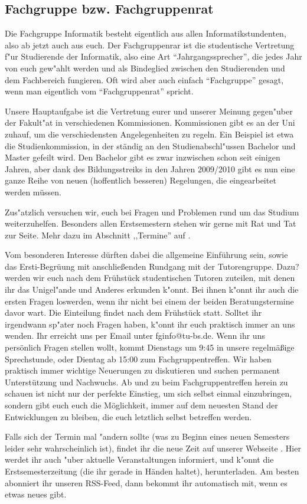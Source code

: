 \label{fachgruppe}\subsection{Fachgruppe bzw. Fachgruppenrat}

Die Fachgruppe Informatik besteht eigentlich aus allen 
Informatikstundenten, also ab jetzt auch aus euch. Der Fachgruppenrar 
ist die studentische Vertretung f"ur Studierende der Informatik, also 
eine Art "`Jahrgangssprecher"', die jedes Jahr von euch gew"ahlt werden 
und als Bindeglied zwischen den Studierenden und dem Fachbereich 
fungieren. Oft wird aber auch einfach "`Fachgruppe"' gesagt, wenn man 
eigentlich vom "`Fachgruppenrat"' spricht.

Unsere Hauptaufgabe ist die Vertretung eurer und unserer Meinung 
gegen"uber der Fakult"at in verschiedenen Kommissionen. Kommissionen 
gibt es an der Uni zuhauf, um die verschiedensten Angelegenheiten zu 
regeln. Ein Beispiel ist etwa die Studienkommission, in der ständig 
an den Studienabschl"ussen Bachelor und Master gefeilt wird. Den Bachelor 
gibt es zwar inzwischen schon seit einigen Jahren, aber dank des 
Bildungsstreiks in den Jahren 2009/2010 gibt es nun eine ganze Reihe 
von neuen (hoffentlich besseren) Regelungen, die eingearbeitet werden 
müssen.

Zus"atzlich versuchen wir, euch bei Fragen und Problemen rund um das 
Studium weiterzuhelfen. Besonders allen Erstsemestern stehen wir 
gerne mit Rat und Tat zur Seite.  Mehr dazu im Abschnitt ,,Termine'' auf
\pageref{termine}.

Vom besonderen Interesse dürften dabei die allgemeine Einführung sein,
sowie das Ersti-Begrüung mit anschließenden Rundgang mit der
Tutorengruppe.
Dazu? werden wir euch nach dem Frühstück studentischen 
Tutoren zuteilen, mit denen ihr das Unigel"ande und Anderes erkunden 
k"onnt. Bei ihnen k"onnt ihr auch die ersten Fragen loswerden, wenn 
ihr nicht bei einem der beiden Beratungstermine davor wart.
Die Einteilung findet nach dem Frühstück statt.
Solltet ihr irgendwann sp"ater noch Fragen haben, k"onnt ihr euch 
praktisch immer an uns wenden. Ihr erreicht uns per Email unter 
fginfo@tu-bs.de. Wenn ihr uns persönlich Fragen stellen wollt, kommt 
Dienstags um 9:45 in unsere regelmäßige Sprechstunde, oder Dientag ab 
15:00 zum Fachgruppentreffen. Wir haben praktisch immer wichtige 
Neuerungen zu diskutieren und suchen permanent Unterstützung und 
Nachwuchs. Ab und zu beim Fachgruppentreffen herein zu schauen ist 
nicht nur der perfekte Einstieg, um sich selbst einmal einzubringen, 
sondern gibt euch euch die Möglichkeit, immer auf dem neuesten Stand 
der Entwicklungen zu bleiben, die euch letztlich selbst betreffen werden.

Falls sich der Termin mal "andern sollte (was zu Beginn eines neuen 
Semesters leider sehr wahrscheinlich ist), findet ihr die neue Zeit 
auf unserer Webseite \mbox{}. Hier 
werdet ihr auch "uber aktuelle Veranstaltungen informiert, und k"onnt 
die Erstsemesterzeitung (die ihr gerade in Händen haltet), herunterladen. 
Am besten abonniert ihr unseren RSS-Feed, dann bekommt ihr automatisch 
mit, wenn es etwas neues gibt.
